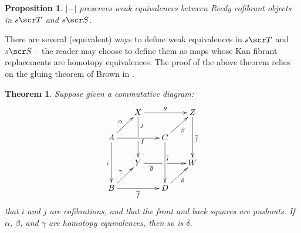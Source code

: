 \documentclass{amsart}
\newtheorem{thm}{Theorem}[section]
\newtheorem{prop}{Proposition}[section]
\theoremstyle{definition}
\begin{document}
\begin{prop}
$|-|$ preserves weak equivalences between Reedy cofibrant objects in $s\sT$ and $s\sS$.
\end{prop}

There are several (equivalent) ways to define weak equivalences in $s\sT$ and $s\sS$ --  the reader may choose to define them as maps whose Kan fibrant replacements are homotopy equivalences. The proof of the above theorem relies on the gluing theorem of Brown in \cite{Brown06topgrp}.

\begin{thm}\label{thm:3.1}
Suppose given a commutative diagram:
\[\xymatrix@-0.5pc{
& X \ar[rr]^g \ar '[d]^j [dd]^<f & & Z \ar[dd]^{\overline{j}}\\
A \ar[dd]_{i} \ar[rr] \ar[ur]^{\alpha} &  & C \ar[dd] \ar[ur]_{\beta} &\\
& Y \ar '[r]_{\overline{g}} [rr]^<{\overline{i}} & & W\\
B \ar[ur]^{\ga} \ar[rr]_{\overline{f}} & & D \ar[ur]_{\delta} &
}\]
\noindent that $i$ and $j$ are cofibrations, and that the front and back squares are pushouts. If $\alpha$, $\beta$, and $\gamma$ are homotopy equivalences, then so is $\delta$.
\end{thm}
\end{document}
